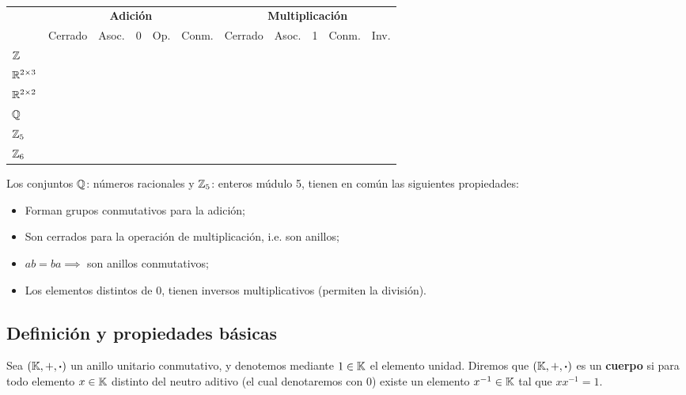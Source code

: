 \begin{table}[H]
	\centering
	\begin{tabular}{|l||c|c|c|c|c||c|c|c|c|c|}
		\hline
		& \multicolumn{5}{c||}{\textbf{Adición}} & \multicolumn{5}{c|}{\textbf{Multiplicación}}\\ \cline{2-11}
		& Cerrado & Asoc. & 0 &  Op. & Conm. & Cerrado & Asoc.& 1 & Conm. & Inv. \\ \hline \hline
		$\mathbb{Z}$ & \cmark & \cmark& \cmark & \cmark & \cmark & \cmark & \cmark& \cmark & \cmark & \xmark\\
		$\mathbb{R}^{2\times 3}$ & \cmark & \cmark & \cmark & \cmark & \cmark & \xmark & \xmark & \xmark & \xmark & \xmark\\
		$\mathbb{R}^{2 \times 2}$ & \cmark & \cmark & \cmark & \cmark & \cmark & \cmark & \cmark & \cmark & \xmark& \xmark\\
		\rowcolor{lightgray!40}%
		$\mathbb{Q}$ & \cmark & \cmark & \cmark& \cmark & \cmark & \cmark & \cmark & \cmark & \cmark& \cmark\\
		\rowcolor{lightgray!40}%
		$\mathbb{Z}_5$ & \cmark & \cmark & \cmark & \cmark & \cmark & \cmark & \cmark & \cmark & \cmark & \cmark\\
		$\mathbb{Z}_6$ & \cmark & \cmark & \cmark & \cmark & \cmark & \cmark & \cmark & \cmark & \cmark & \xmark\\ \hline
	\end{tabular}
	\caption{}
	\label{tab:cuerpo}
\end{table}
Los conjuntos $\mathbb{Q}$: números racionales y $\mathbb{Z}_5$: enteros múdulo 5, tienen en común las siguientes propiedades:
\begin{itemize}
	\item Forman grupos conmutativos para la adición;
	\item Son cerrados para la operación de multiplicación, i.e. son anillos;
	\item $ab = ba \implies$ son anillos conmutativos;
	\item Los elementos distintos de 0, tienen inversos multiplicativos (permiten la división).
\end{itemize}

\subsection{Definición y propiedades básicas}
\vspace{3mm}
\begin{fmd-definition}[Cuerpo]
	Sea $(\mathbb{K}, +, \boldsymbol{\cdot})$ un anillo unitario conmutativo, y denotemos mediante $1 \in \mathbb{K}$ el elemento unidad. Diremos que $(\mathbb{K}, +, \boldsymbol{\cdot})$ es un \textbf{cuerpo} si para todo elemento $x \in \mathbb{K}$ distinto del neutro aditivo (el cual denotaremos con 0) existe un elemento $x^{-1} \in \mathbb{K}$ tal que $xx^{-1} = 1$.
\end{fmd-definition}

